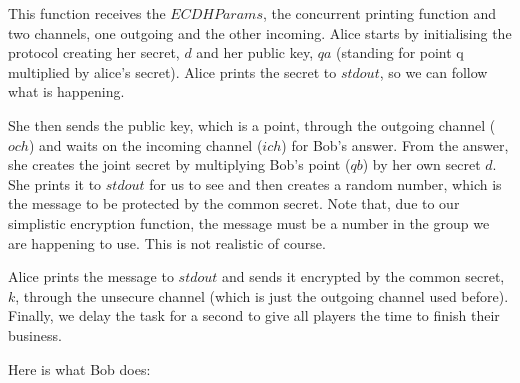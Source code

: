 \documentclass[tikz]{scrreprt}
\newcommand{\Conid}[1]{\mathit{#1}}
\newcommand{\Varid}[1]{\mathit{#1}}
\begin{document}
This function receives the \ensuremath{\Conid{ECDHParams}}, 
the concurrent printing function
and two channels, one outgoing and the other incoming.
Alice starts by initialising the protocol
creating her secret, \ensuremath{\Varid{d}} and her public key, \ensuremath{\Varid{qa}}
(standing for point q multiplied by alice's secret).
Alice prints the secret to $stdout$, so we can follow
what is happening.

She then sends the public key, which is a point,
through the outgoing channel (\ensuremath{\Varid{och}}) and waits
on the incoming channel (\ensuremath{\Varid{ich}}) for Bob's answer.
From the answer, she creates the joint secret
by multiplying Bob's point (\ensuremath{\Varid{qb}}) by her own secret \ensuremath{\Varid{d}}.
She prints it to $stdout$ for us to see and then creates
a random number, which is the message to be protected
by the common secret. Note that, due to our simplistic
encryption function, the message must be a number 
in the group we are happening to use.
This is not realistic of course.

Alice prints the message to $stdout$ and
sends it encrypted by the common secret, \ensuremath{\Varid{k}}, 
through the unsecure channel (which is just the
outgoing channel used before).
Finally, we delay the task for a second
to give all players the time to finish their business.

Here is what Bob does:
\end{document}

